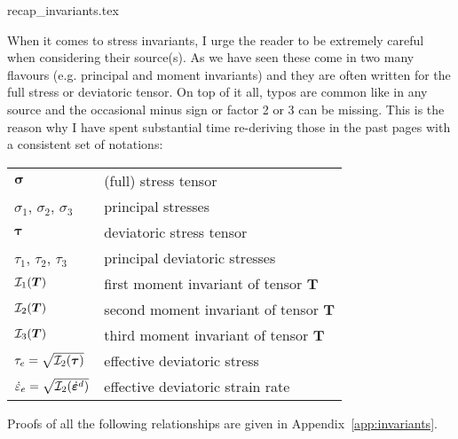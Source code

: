 \begin{flushright} {\tiny {\color{gray} recap\_invariants.tex}} \end{flushright}

When it comes to stress invariants, I urge the reader to be extremely careful when considering 
their source(s). As we have seen these come in two many flavours (e.g. principal and moment invariants)
and they are often written for the full stress or deviatoric tensor. On top of it all, 
typos are common like in any source and the occasional minus sign or factor 2 or 3 can be missing.
This is the reason why I have spent substantial time re-deriving those in the past pages 
with a consistent set of notations:
\begin{center}
\begin{tabular}{ll}
\hline
${\bm \sigma}$ & (full) stress tensor \\
$\sigma_1$, $\sigma_2$, $\sigma_3$ & principal stresses \\ 
${\bm \tau}$   & deviatoric stress tensor \\
$\tau_1$, $\tau_2$, $\tau_3$ & principal deviatoric stresses \\ 
${\cal I}_1({\bm T})$ & first moment invariant of tensor ${\bm T}$ \\
${\cal I}_2({\bm T})$ & second moment invariant of tensor ${\bm T}$ \\
${\cal I}_3({\bm T})$ & third moment invariant of tensor ${\bm T}$ \\
${\tau}_{e}=\sqrt{{\cal I}_2({\bm \tau})}$ & effective deviatoric stress \\
$\dot{{\varepsilon}}_{e}=\sqrt{{\cal I}_2(\dot{\bm \varepsilon}^d)}$ & effective deviatoric strain rate \\
\hline
\end{tabular}
\end{center}
Proofs of all the following relationships are given in Appendix~\ref{app:invariants}.


